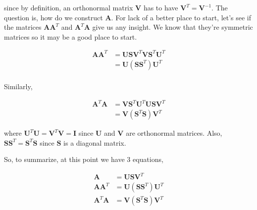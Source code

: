 since by definition, an orthonormal matrix $\mathbf{V}$ has to have $\mathbf{V}^T = \mathbf{V}^{-1}$.  The question is, how do we construct $\mathbf{A}$.  For lack of a better place to start, let's see if the matrices $\mathbf{A}\mathbf{A}^T$ and $\mathbf{A}^T\mathbf{A}$ give us any insight.  We know that they're symmetric matrices so it may be a good place to start.


\begin{equation}
\begin{array}{llll}
\mathbf{A}\mathbf{A}^T&= \mathbf{U} \mathbf{S} \mathbf{V}^T \mathbf{V} \mathbf{S}^T \mathbf{U}^T\\
&=\mathbf{U} (\mathbf{S} \mathbf{S}^T) \mathbf{U}^T\\ 
\end{array}
\label{Eq:first}
\end{equation}

Similarly,

\begin{equation}
\begin{array}{llll}
\mathbf{A}^T\mathbf{A}&=\mathbf{V} \mathbf{S}^T \mathbf{U}^T \mathbf{U} \mathbf{S} \mathbf{V}^T\\
&=\mathbf{V} (\mathbf{S}^T \mathbf{S}) \mathbf{V}^T
\end{array}
\label{Eq:second}
\end{equation}

where $\mathbf{U}^T \mathbf{U} =\mathbf{V}^T \mathbf{V} = \mathbf{I}$ since $\mathbf{U}$ and $\mathbf{V}$ are orthonormal matrices.  Also, $\mathbf{S} \mathbf{S}^T = \mathbf{S}^T \mathbf{S}$ since $\mathbf{S}$ is a diagonal matrix.  

So, to summarize, at this point we have 3 equations,

\begin{equation}
\boxed{
\begin{array}{llll}
\mathbf{A} &=\mathbf{U} \mathbf{S} \mathbf{V}^T\\
\mathbf{A}\mathbf{A}^T&=\mathbf{U} (\mathbf{S} \mathbf{S}^T) \mathbf{U}^T\\
\mathbf{A}^T\mathbf{A}&=\mathbf{V} (\mathbf{S}^T \mathbf{S}) \mathbf{V}^T\\
\end{array}}
\label{Eq:summary}
\end{equation}

